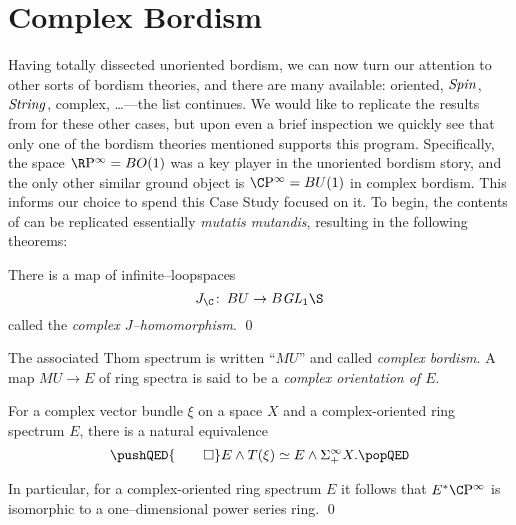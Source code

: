 
\chapter{Complex Bordism}\label{ComplexBordismChapter}


Having totally dissected unoriented bordism, we can now turn our attention to other sorts of bordism theories, and there are many available: oriented, \(\mathit{Spin}\), \(\mathit{String}\), complex, \ldots---the list continues.  We would like to replicate the results from  for these other cases, but upon even a brief inspection we quickly see that only one of the bordism theories mentioned supports this program.  Specifically, the space \(\RP^\infty = BO(1)\) was a key player in the unoriented bordism story, and the only other similar ground object is \(\CP^\infty = BU(1)\) in complex bordism.  This informs our choice to spend this Case Study focused on it.  To begin, the contents of  can be replicated essentially \textit{mutatis mutandis}, resulting in the following theorems:

\begin{theorem}\label{ComplexJHomomorphism}
There is a map of infinite--loopspaces \[J_{\C}\co BU \to B \GL_1 \S\] called the \textit{complex \(J\)--homomorphism}. \qed
\end{theorem}

\begin{definition}\label{DefnComplexOrientation}
The associated Thom spectrum is written ``\(MU\)'' and called \textit{complex bordism}.  A map \(MU \to E\) of ring spectra is said to be a \textit{complex orientation of \(E\)}.
\end{definition}

\begin{theorem}\label{ThomIsomOverC}
For a complex vector bundle \(\xi\) on a space \(X\) and a complex-oriented ring spectrum \(E\), there is a natural equivalence \[\pushQED{\qed}
E \sm T(\xi) \simeq E \sm \Susp^\infty_+ X. \qedhere
\popQED\]
\end{theorem}

\begin{corollary}\label{CPinftyNiceCalculation}
In particular, for a complex-oriented ring spectrum \(E\) it follows that \(E^* \CP^\infty\) is isomorphic to a one--dimensional power series ring. \qed
\end{corollary}


